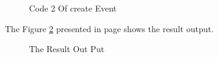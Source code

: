 \documentclass[12pt,a4paper,class,twoside,openany]{report}
\begin{document}
{\begin{figure}
\begin{center}
\caption{Code 2 Of create Event}
\label{fg:4-22}
\end{center}
\end{figure}
The Figure \ref{fg:4-23} presented in page \pageref{fg:4-23} shows the result output. 
\begin{figure}
\begin{center}
\caption{ The Result Out Put }
\label{fg:4-23}
\end{center}
\end{figure}
}
\end{document}
